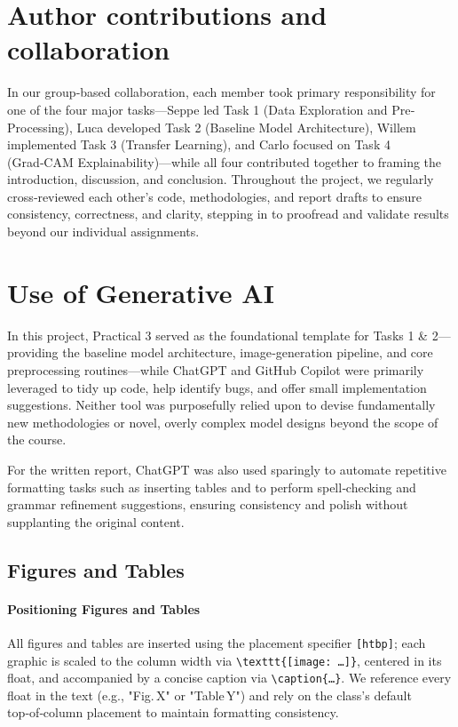 \documentclass[conference]{IEEEtran}
\begin{document}
\section{Author contributions and collaboration}

In our group‐based collaboration, each member took primary responsibility for one of the four major tasks—Seppe led Task 1 (Data Exploration and Pre‐Processing), Luca developed Task 2 (Baseline Model Architecture), Willem implemented Task 3 (Transfer Learning), and Carlo focused on Task 4 (Grad‑CAM Explainability)—while all four contributed together to framing the introduction, discussion, and conclusion. Throughout the project, we regularly cross‐reviewed each other’s code, methodologies, and report drafts to ensure consistency, correctness, and clarity, stepping in to proofread and validate results beyond our individual assignments.

\section{Use of Generative AI}

In this project, Practical 3 served as the foundational template for Tasks 1 \& 2—providing the baseline model architecture, image‐generation pipeline, and core preprocessing routines—while ChatGPT and GitHub Copilot were primarily leveraged to tidy up code, help identify bugs, and offer small implementation suggestions. Neither tool was purposefully relied upon to devise fundamentally new methodologies or novel, overly complex model designs beyond the scope of the course. 

For the written report, ChatGPT was also used sparingly to automate repetitive formatting tasks such as inserting tables and to perform spell‑checking and grammar refinement suggestions, ensuring consistency and polish without supplanting the original content.

\subsection{Figures and Tables}

\paragraph{Positioning Figures and Tables}

All figures and tables are inserted using the placement specifier \verb|[htbp]|; each graphic is scaled to the column width via
\verb|\texttt{[image: …]}|, centered in its float, and accompanied by a concise caption via \verb|\caption{…}|. We reference every float in the text (e.g., "Fig. X" or "Table Y") and rely on the class’s default top‑of‑column placement to maintain formatting consistency.
\end{document}
